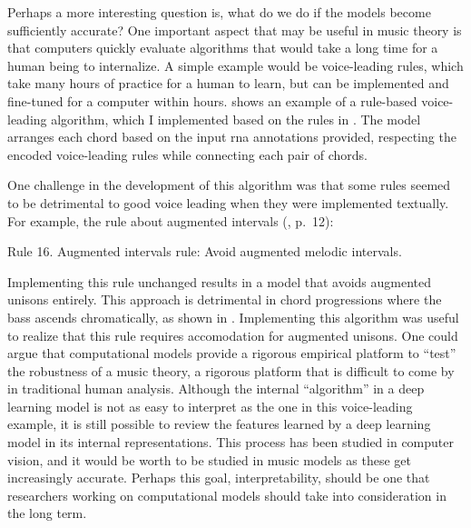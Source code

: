 

Perhaps a more interesting question is, what do we do if the
models become sufficiently accurate? One important aspect
that may be useful in music theory is that computers quickly
evaluate algorithms that would take a long time for a human
being to internalize. A simple example would be
voice-leading rules, which take many hours of practice for a
human to learn, but can be implemented and fine-tuned for a
computer within hours. 
shows an example of a rule-based voice-leading algorithm,
which I implemented based on the rules in
\textcite[p.~10]{huron2016voice}.
The model arranges each chord based on the input \gls{rna}
annotations provided, respecting the encoded voice-leading
rules while connecting each pair of chords. 


One challenge in the development of this algorithm was that
some rules seemed to be detrimental to good voice leading
when they were implemented textually. For example, the rule
about augmented intervals (\cite{huron2016voice}, p.~12):

\begin{italicsquote}
    Rule 16. Augmented intervals rule: Avoid augmented
    melodic intervals.
\end{italicsquote}

Implementing this rule unchanged results in a model that
avoids augmented unisons entirely. This approach is
detrimental in chord progressions where the bass ascends
chromatically, as shown in
. Implementing this
algorithm was useful to realize that this rule requires
accomodation for augmented unisons. One could argue that
computational models provide a rigorous empirical platform
to ``test'' the robustness of a music theory, a rigorous
platform that is difficult to come by in traditional human
analysis. Although the internal ``algorithm'' in a deep
learning model is not as easy to interpret as the one in
this voice-leading example, it is still possible to review
the features learned by a deep learning model in its
internal representations. This process has been studied in
computer vision, and it would be worth to be studied in
music models as these get increasingly accurate. Perhaps
this goal, interpretability, should be one that researchers
working on computational models should take into
consideration in the long term.
